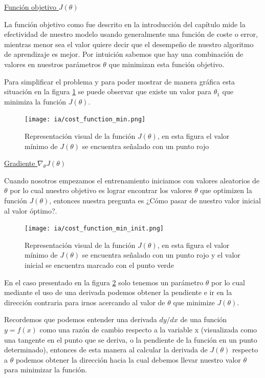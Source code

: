 \documentclass[11pt,fleqn]{book} %
\begin{document}
\underline{Función objetivo $J(\theta)$}

La función objetivo como fue descrito en la introducción del capítulo mide la efectividad de nuestro modelo usando generalmente una función de coste o error, mientras menor sea el valor quiere decir que el desempeño de nuestro algoritmo de aprendizaje es mejor. Por intuición sabemos que hay una combinación de valores en nuestros parámetros $\theta$ que minimizan esta función objetivo.

Para simplificar el problema y para poder mostrar de manera gráfica esta situación en la figura \ref{fig:cost_function_min} se puede observar que existe un valor para $\theta_1$ que minimiza la función $J(\theta)$.


\begin{figure}[ht]
\centering\texttt{[image: ia/cost\_function\_min.png]}
\caption{Representación visual de la función $J(\theta)$, en esta figura el valor mínimo de $J(\theta)$ se encuentra señalado con un punto rojo}

\label{fig:cost_function_min} 
\end{figure}

\underline{Gradiente $\nabla _{\theta} J(\theta)$}

Cuando nosotros empezamos el entrenamiento iniciamos con valores aleatorios de $\theta$ por lo cual nuestro objetivo es lograr encontrar los valores $\theta$ que optimizen la función  $J(\theta)$, entonces nuestra pregunta es ¿Cómo pasar de nuestro valor inicial al valor óptimo?.

\begin{figure}[ht]
\centering\texttt{[image: ia/cost\_function\_min\_init.png]}
\caption{Representación visual de la función $J(\theta)$, en esta figura el valor mínimo de $J(\theta)$ se encuentra señalado con un punto rojo y el valor inicial se encuentra marcado con el punto verde}

\label{fig:cost_function_min_init} 
\end{figure}

En el caso presentado en la figura \ref{fig:cost_function_min_init} solo tenemos un parámetro $\theta$ por lo cual mediante el uso de una derivada podemos obtener la pendiente e ir en la dirección contraria para irnos acercando al valor de $\theta$ que minimize $J(\theta)$.

Recordemos que podemos entender una derivada $dy/dx$ de una función $y=f(x)$ como una razón de cambio respecto a la variable x (visualizada como una tangente en el punto que se deriva, o la pendiente de la función en un punto determinado), entonces de esta manera al calcular la derivada de $J(\theta)$ respecto a $\theta$ podemos obtener la dirección hacia la cual debemos llevar nuestro valor $\theta$ para minimizar la función.
\end{document}
